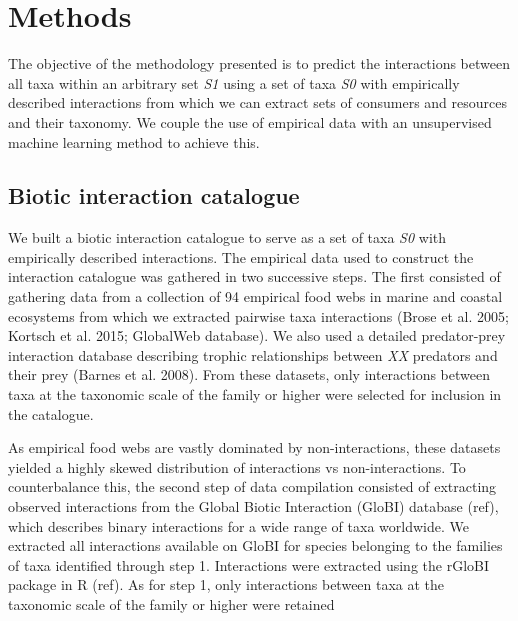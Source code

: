 \documentclass[letterpaper]{article}
\begin{document}
\section{Methods}
The objective of the methodology presented is to predict the interactions between all taxa within an arbitrary set \textit{S1} using a set of taxa \textit{S0} with empirically described interactions from which we can extract sets of consumers and resources and their taxonomy. We couple the use of empirical data with an unsupervised machine learning method to achieve this.

 \subsection{Biotic interaction catalogue}

We built a biotic interaction catalogue to serve as a set of taxa \textit{S0} with empirically described interactions. The empirical data used to construct the interaction catalogue was gathered in two successive steps. The first consisted of gathering data from a collection of 94 empirical food webs in marine and coastal ecosystems from which we extracted pairwise taxa interactions (Brose et al. 2005; Kortsch et al. 2015; GlobalWeb database). We also used a detailed predator-prey interaction database describing trophic relationships between \textit{XX} predators and their prey (Barnes et al. 2008). From these datasets, only interactions between taxa at the taxonomic scale of the family or higher were selected for inclusion in the catalogue.

As empirical food webs are vastly dominated by non-interactions, these datasets yielded a highly skewed distribution of interactions vs non-interactions. To counterbalance this, the second step of data compilation consisted of extracting observed interactions from the Global Biotic Interaction (GloBI) database (ref), which describes binary interactions for a wide range of taxa worldwide. We extracted all interactions available on GloBI for species belonging to the families of taxa identified through step 1. Interactions were extracted using the rGloBI package in R (ref). As for step 1, only interactions between taxa at the taxonomic scale of the family or higher were retained
\end{document}
